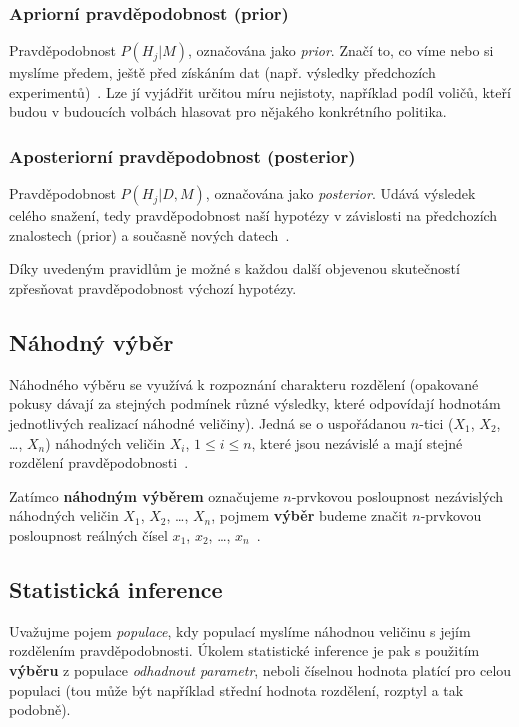 \documentclass[thesis=M,czech]{FITthesis}[2014/05/07]
\begin{document}
\subsubsection{Apriorní pravděpodobnost (prior)}
\label{prior}
Pravděpodobnost $P(H_j | M)$, označována jako \emph{prior}. Značí to, co víme nebo si myslíme předem, ještě před získáním dat (např. výsledky předchozích experimentů)~\cite{pst4}. Lze jí vyjádřit určitou míru nejistoty, například podíl voličů, kteří budou v budoucích volbách hlasovat pro nějakého konkrétního politika. 

\subsubsection{Aposteriorní pravděpodobnost (posterior)}
\label{poster}
Pravděpodobnost $P(H_j | D, M)$, označována jako \emph{posterior}. Udává výsledek celého snažení, tedy pravděpodobnost naší hypotézy v závislosti na předchozích znalostech (prior) a současně nových datech~\cite{pst4}.

Díky uvedeným pravidlům je možné s každou další objevenou skutečností zpřesňovat pravděpodobnost výchozí hypotézy. 

\subsection{Náhodný výběr}
\label{randomvyber}
Náhodného výběru se využívá k rozpoznání charakteru rozdělení (opakované pokusy dávají za stejných podmínek různé výsledky, které odpovídají hodnotám jednotlivých realizací náhodné veličiny). Jedná se o uspořádanou $n$-tici ($X_1$, $X_2$, \ldots, $X_n$) náhodných veličin $X_i$, $1 \leq i \leq n$, které jsou nezávislé a mají stejné rozdělení pravděpodobnosti~\cite{pst3}.

Zatímco \textbf{náhodným výběrem} označujeme $n$-prvkovou posloupnost nezávislých náhodných veličin $X_1$, $X_2$, \ldots, $X_n$, pojmem \textbf{výběr} budeme značit $n$-prvkovou posloupnost reálných čísel $x_1$, $x_2$, \ldots, $x_n$~\cite{pst5}. 

\subsection{Statistická inference}
\label{inferno}
\cite{pst5} Uvažujme pojem \emph{populace}, kdy populací myslíme náhodnou veličinu s jejím rozdělením pravděpodobnosti. Úkolem statistické inference je pak s použitím \textbf{výběru} z populace \emph{odhadnout parametr}, neboli číselnou hodnota platící pro celou populaci (tou může být například střední hodnota rozdělení, rozptyl a tak podobně).
\end{document}
